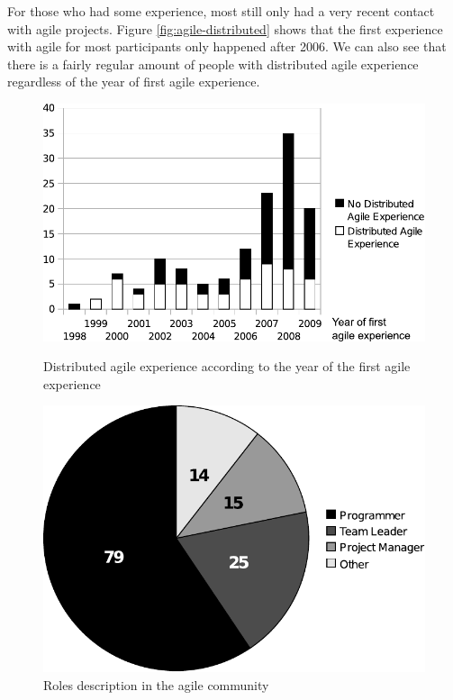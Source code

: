 \documentclass[lnbip]{svmultln}
\begin{document}
For those who had some experience, most still only had a very recent
contact with agile projects. Figure \ref{fig:agile-distributed} shows
that the first experience with agile for most participants only
happened after 2006. We can also see that there is a fairly regular
amount of people with distributed agile experience regardless of the
year of first agile experience.

\begin{figure}[htb]
  \begin{minipage}[t]{0.55\linewidth}
    \centering
    \includegraphics[scale=.45]{agile-distributed.pdf}
    \caption{Distributed agile experience according to the year of the
      first agile experience}
    \label{fig:agile-distributed}
  \end{minipage}
  \begin{minipage}[t]{0.45\linewidth}
    \centering
    \includegraphics[scale=.45]{agile-roles.pdf}
    \caption{Roles description in the agile community}
    \label{fig:agile-roles}
  \end{minipage}
\end{figure}
\end{document}
